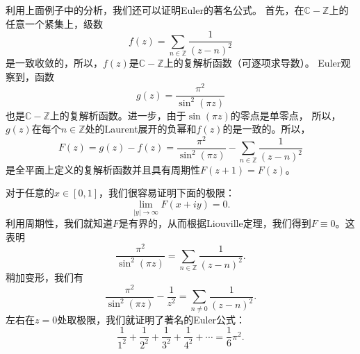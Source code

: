 利用上面例子中的分析，我们还可以证明Euler的著名公式。
首先，在$\mathbb{C}-\mathbb{Z}$上的任意一个紧集上，级数
\[f(z)=\displaystyle \sum_{n\in \mathbb{Z}} \frac{1}{(z-n)^2}\]
是一致收敛的，所以，$f(z)$是$\mathbb{C}-\mathbb{Z}$上的复解析函数（可逐项求导数）。
Euler观察到，函数
\[g(z)= \frac{\pi^2}{\sin^2(\pi z)}\]
也是$\mathbb{C}-\mathbb{Z}$上的复解析函数。进一步，由于$\sin(\pi z)$的零点是单零点，
所以，$g(z)$在每个$n\in \mathbb{Z}$处的Laurent展开的负幂和$f(z)$的是一致的。所以，
\begin{equation*}
F(z)=g(z)-f(z)=\frac{\pi^2}{\sin^2(\pi z)}-\sum_{n\in \mathbb{Z}} \frac{1}{(z-n)^2}
\end{equation*}
是全平面上定义的复解析函数并且具有周期性$F(z+1)=F(z)$。

对于任意的$x\in[0,1]$，我们很容易证明下面的极限：
\[\lim_{|y|\rightarrow \infty} F(x+iy)=0.\]
利用周期性，我们就知道$F$是有界的，从而根据Liouville定理，我们得到$F\equiv 0$。这表明
\begin{equation*}
\frac{\pi^2}{\sin^2(\pi z)}=\sum_{n\in \mathbb{Z}} \frac{1}{(z-n)^2}.
\end{equation*}
稍加变形，我们有
\begin{equation*}
\frac{\pi^2}{\sin^2(\pi z)}-\frac{1}{z^2}=\sum_{n\neq 0} \frac{1}{(z-n)^2}.
\end{equation*}
左右在$z=0$处取极限，我们就证明了著名的Euler公式：
\begin{equation*}
\frac{1}{1^2}+\frac{1}{2^2}+\frac{1}{3^2}+\frac{1}{4^2}+\cdots =\frac{1}{6}\pi^2.
\end{equation*}

